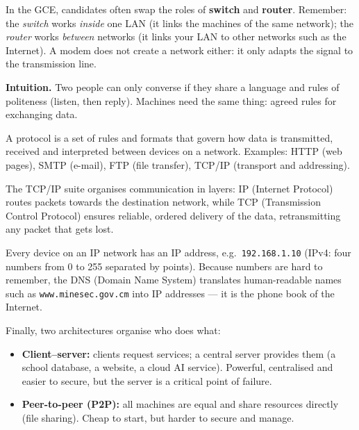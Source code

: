 \documentclass[11pt]{article}
\newcommand{\cle}[1]{{\popxbold\color{popdark}#1}}
\newcounter{popsec}
\newcounter{popsub}
\newcommand{\courssub}[1]{%
  \stepcounter{popsub}%
  \par\vspace{9pt}\noindent{\popxbold\fontsize{11.5}{13}\selectfont\color{popink}{\color{poporange}\thepopsec.\thepopsub}\hspace{6pt}#1}\par\nopagebreak\vspace{4pt}
}
\begin{document}
\begin{attention}
In the GCE, candidates often swap the roles of \textbf{switch} and \textbf{router}. Remember: the \emph{switch} works \emph{inside} one LAN (it links the machines of the same network); the \emph{router} works \emph{between} networks (it links your LAN to other networks such as the Internet). A modem does not create a network either: it only adapts the signal to the transmission line.
\end{attention}

\courssub{Protocols, TCP/IP and Addressing}

\textbf{Intuition.} Two people can only converse if they share a language and rules of politeness (listen, then reply). Machines need the same thing: agreed rules for exchanging data.

\begin{definition}[Protocol]
A \cle{protocol} is a set of rules and formats that govern how data is transmitted, received and interpreted between devices on a network. Examples: HTTP (web pages), SMTP (e-mail), FTP (file transfer), TCP/IP (transport and addressing).
\end{definition}

The \cle{TCP/IP} suite organises communication in layers: \cle{IP} (Internet Protocol) routes packets towards the destination network, while \cle{TCP} (Transmission Control Protocol) ensures reliable, ordered delivery of the data, retransmitting any packet that gets lost.

Every device on an IP network has an \cle{IP address}, e.g.\ \texttt{192.168.1.10} (IPv4: four numbers from 0 to 255 separated by points). Because numbers are hard to remember, the \cle{DNS} (Domain Name System) translates human-readable names such as \texttt{www.minesec.gov.cm} into IP addresses --- it is the phone book of the Internet.

Finally, two architectures organise who does what:
\begin{itemize}
\item \textbf{Client--server:} clients request services; a central server provides them (a school database, a website, a cloud AI service). Powerful, centralised and easier to secure, but the server is a critical point of failure.
\item \textbf{Peer-to-peer (P2P):} all machines are equal and share resources directly (file sharing). Cheap to start, but harder to secure and manage.
\end{itemize}
\end{document}
